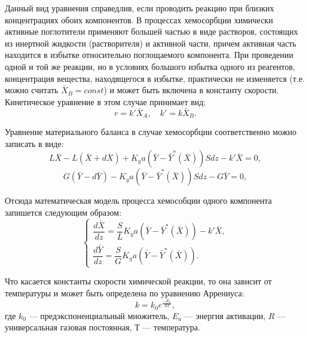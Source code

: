 Данный вид уравнения справедлив, если проводить реакцию при близких концентрациях обоих компонентов. В процессах хемосорбции химически активные поглотители применяют большей частью в виде растворов, состоящих из инертной жидкости (растворителя) и активной части, причем активная часть находится в избытке относительно поглощаемого компонента. При проведении одной и той же реакции, но в условиях большого избытка одного из реагентов, концентрация вещества, находящегося в избытке, практически не изменяется (т.е. можно считать $\bar{X}_B=const$) и может быть включена в константу скорости. Кинетическое уравнение в этом случае принимает вид:
\begin{equation}
r=k' \bar{X}_A, \quad k'=k \bar{X}_B.
\end{equation}

Уравнение материального баланса в случае хемосорбции соответственно можно записать в виде:
\begin{equation}
L \bar{X} - L(\bar{X} +d\bar{X}) + K_y a (\bar{Y}-\bar{Y}^*(\bar{X}))Sdz-k'\bar{X}=0, 
\end{equation}
\begin{equation}
G(\bar{Y}-d\bar{Y})-K_y a (\bar{Y}-\bar{Y}^*(\bar{X}))Sdz- G\bar{Y}=0,
\end{equation}

Отсюда математическая модель процесса хемособции одного компонента запишется следующим образом:
\begin{equation} \label{eq.mass.him}
\left\lbrace 
\begin{gathered} 
\dfrac{d\bar{X}}{dz}=\dfrac{S}{L} K_y a (\bar{Y}-\bar{Y}^*(\bar{X}))-k'\bar{X},
\\
\dfrac{d\bar{Y}}{dz}=\dfrac{S}{G} K_y a (\bar{Y}-\bar{Y}^*(\bar{X})).
\end{gathered} 
\right.
\end{equation}

Что касается константы скорости химической реакции, то она зависит от температуры и может быть определена по уравнению Аррениуса:
\begin{equation}
	k=k_0 e^{\frac{-E_a}{R T}},
\end{equation}
где $k_0$ --- предэкспоненциальный множитель, $E_a$ --- энергия активации, $R$ --- универсальная газовая постоянная, $Т$ --- температура. 

